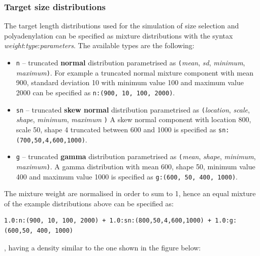\subsubsection{Target size distributions}
\label{sss:target_mix}

The target length distributions used for the simulation of size selection and polyadenylation can be specified as mixture distributions with the syntax \emph{weight}:\emph{type}:\emph{parameters}. The available types are the following:

\begin{itemize}
\item{{\tt n} -- truncated {\bf normal} distribution \cite{dist_normal} parametrised as {\tt(}\emph{mean}, \emph{sd}, \emph{minimum}, \emph{maximum}{\tt )}. 
For example a truncated normal mixture component with mean 900, standard deviation 10 with minimum value 100 and maximum value 2000 can be specified as \texttt{n:(900, 10, 100, 2000)}}.
\item{{\tt sn} -- truncated {\bf skew normal} distribution \cite{dist_skew_normal} parametrised as \texttt{(}{\it location}, {\it scale}, {\it shape}, {\it minimum}, {\it maximum} \texttt{)}
A skew normal component with location 800, scale 50, shape 4 truncated between 600 and 1000 is specified as {\tt sn:(700,50,4,600,1000)}.}
\item{{\tt g} -- truncated {\bf gamma} distribution \cite{dist_gamma} parametrised as \texttt{(}\emph{mean}, \emph{shape}, \emph{minimum}, \emph{maximum}\texttt{)}. A gamma distribution with mean 600, shape 50, minimum value 400 and maximum value 1000 is specified as {\tt g:(600, 50, 400, 1000)}.
}
\end{itemize}

The mixture weight are normalised in order to sum to 1, hence an equal mixture of the example distributions above can be specified as:

\begin{verbatim}
1.0:n:(900, 10, 100, 2000) + 1.0:sn:(800,50,4,600,1000) + 1.0:g:(600,50, 400, 1000)
\end{verbatim}

, having a density similar to the one shown in the figure below:

